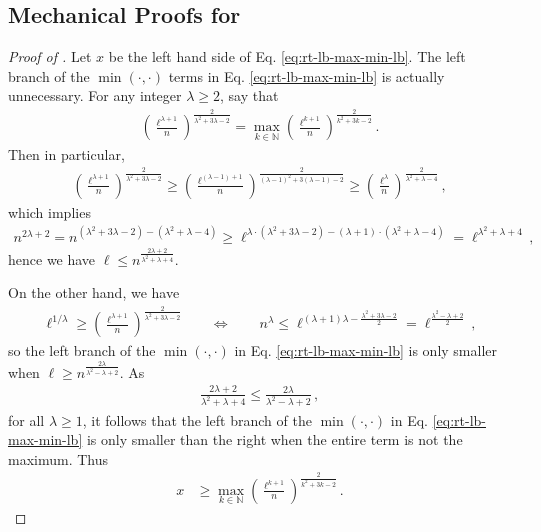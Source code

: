 \documentclass[10pt,a4paper]{article}
\theoremstyle{definition}
\theoremstyle{remark}
\newcommand{\NN}{\mathbb{N}}
\newcommand{\rl}{\mathbf{\ell}}             %
\begin{document}
\begin{itemize}
\begin{itemize}
\subsection{Mechanical Proofs for \texorpdfstring{}{Random Tape Lower Bound}}\label{subsec:rt-lb-mech}

\begin{proof}[Proof of ]
  Let $x$ be the left hand side of Eq. \ref{eq:rt-lb-max-min-lb}.
  The left branch of the $\min(\cdot,\cdot)$ terms in Eq. \ref{eq:rt-lb-max-min-lb} is actually unnecessary. For any integer $\lambda \ge 2$, say that
  \begin{align*}
    \left(\frac{\rl^{\lambda + 1}}{n}\right)^{\frac{2}{\lambda^2 + 3 \lambda - 2}} = \max_{k \in \NN} \left(\frac{\rl^{k + 1}}{n}\right)^{\frac{2}{k^2 + 3 k - 2}} \,.
  \end{align*}
  Then in particular,
  \begin{align*}
    \left(\frac{\rl^{\lambda + 1}}{n}\right)^{\frac{2}{\lambda^2 + 3 \lambda - 2}} \ge \left(\frac{\rl^{(\lambda -1) + 1}}{n}\right)^{\frac{2}{(\lambda-1)^2 + 3 (\lambda -1)- 2}} \ge     \left(\frac{\rl^{\lambda}}{n}\right)^{\frac{2}{\lambda^2 + \lambda - 4}} \,,
  \end{align*}
  which implies
  \begin{align*}
    n^{2 \lambda + 2} = n^{(\lambda^2 + 3 \lambda - 2) - (\lambda^2 + \lambda - 4)} \ge \rl^{\lambda \cdot (\lambda^2 + 3 \lambda - 2) - (\lambda + 1) \cdot (\lambda^2 + \lambda - 4)} = \rl^{\lambda^2 + \lambda + 4} \,,
  \end{align*}
  hence we have $\rl \le n^{\frac{2 \lambda +2}{\lambda^2 + \lambda + 4}}$. 

  On the other hand, we have
  \begin{align*}
    \rl^{1/\lambda} \ge \left(\frac{\rl^{\lambda + 1}}{n}\right)^{\frac{2}{\lambda^2 + 3 \lambda - 2}} \qquad \iff \qquad n^\lambda \le \rl^{(\lambda + 1) \lambda - \frac{\lambda^2+3\lambda - 2}{2}} = \rl^{\frac{\lambda^2 - \lambda + 2}{2}} \,,
  \end{align*}
  so the left branch of the $\min(\cdot,\cdot)$ in Eq. \ref{eq:rt-lb-max-min-lb} is only smaller when $\rl \ge n^{\frac{2 \lambda}{\lambda^2 - \lambda + 2}}$. As
  \begin{align*}
    \frac{2 \lambda +2}{\lambda^2 + \lambda + 4} \le \frac{2 \lambda}{\lambda^2 - \lambda + 2} \,,
  \end{align*}
  for all $\lambda \ge 1$, it follows that the left branch of the $\min(\cdot,\cdot)$ in Eq. \ref{eq:rt-lb-max-min-lb} is only smaller than the right when the entire term is not the maximum. Thus
  \begin{align*}
    x &\ge \max_{k \in \NN} \left(\frac{\rl^{k + 1}}{n}\right)^{\frac{2}{k^2 + 3 k - 2}} \,.
  \end{align*}


\end{proof}
\end{itemize}
\end{itemize}
\end{document}
